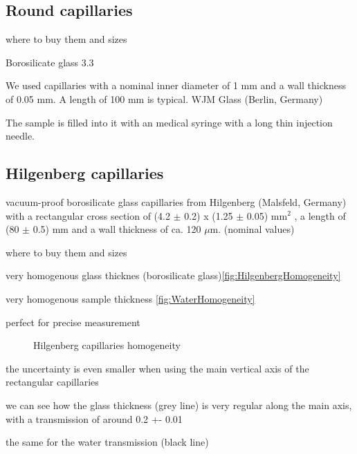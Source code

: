 \subsection{Round capillaries}

where to buy them and sizes

Borosilicate glass 3.3

We used capillaries with a nominal inner diameter of 1 mm and a wall thickness of 0.05 mm. A length of 100 mm is typical. WJM Glass (Berlin, Germany)

The sample is filled into it with an medical syringe with a long thin injection needle. 


\subsection{Hilgenberg capillaries}


vacuum-proof borosilicate glass capillaries from Hilgenberg (Malsfeld, Germany) with a rectangular cross section of (4.2 $\pm$ 0.2) x (1.25 $\pm$ 0.05) mm$^2$ , a length of (80 $\pm$ 0.5) mm and a wall thickness of ca. 120 $\mu$m. (nominal values)



where to buy them and sizes

very homogenous glass thicknes (borosilicate glass)\ref{fig:HilgenbergHomogeneity}

very homogenous sample thickness \ref{fig:WaterHomogeneity}

perfect for precise measurement

\begin{figure}%
	\centering
		\caption{Hilgenberg capillaries homogeneity}
\end{figure}

the uncertainty is even smaller when using the main vertical axis of the rectangular capillaries

we can see how the glass thickness (grey line) is very regular along the main axis, with a transmission of around 0.2 +- 0.01

the same for the water transmission (black line)

